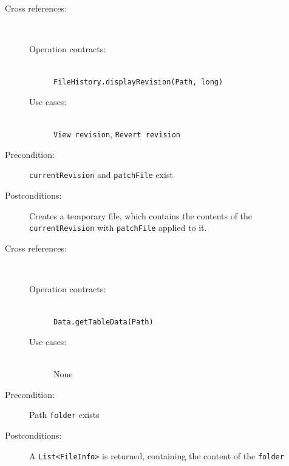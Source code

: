 \documentclass[12pt,a4paper]{article}
\begin{document}
\begin{description}
	\item[Cross references:] \hfill \vspace{-4ex} \\
	\begin{description}
		\item[Operation contracts:] \hfill \\
			\texttt{FileHistory.displayRevision(Path, long)}
		\item[Use cases:] \hfill \\
			\texttt{View revision}, \texttt{Revert revision}
	\end{description}
	\item[Precondition:] \texttt{currentRevision} and \texttt{patchFile} exist
	\item[Postconditions:] Creates a temporary file, which contains the contents of the 		\texttt{currentRevision} with \texttt{patchFile} applied to it.
\end{description}

\vspace{0.75cm}

\begin{description}
	\item[Cross references:] \hfill \vspace{-4ex}  \\
	\begin{description} 
		\item[Operation contracts:] \hfill \\
			\texttt{Data.getTableData(Path)}
		\item[Use cases:] \hfill \\
			None
	\end{description}
	\item[Precondition:] Path \texttt{folder} exists
	\item[Postconditions:] A \texttt{List<FileInfo>} is returned, containing the content of the \texttt{folder}
\end{description}

\vspace{0.75cm}
\end{document}

